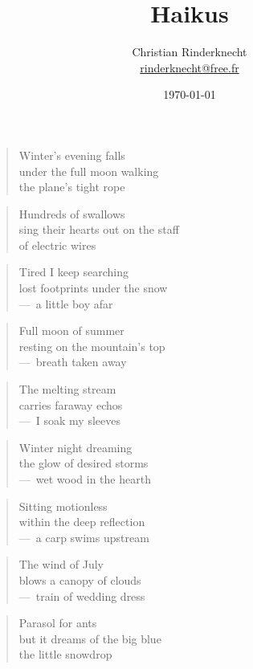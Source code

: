 \documentclass[a4paper,12pt]{article}
\title{Haikus}
\author{Christian Rinderknecht\\
{\small \url{rinderknecht@free.fr}}}
\date{\today}
\begin{document}
\begin{verse}
  Winter's evening falls \\
  under the full moon walking \\
  the plane's tight rope
\end{verse}

\begin{verse}
  Hundreds of swallows \\
  sing their hearts out on the staff \\
  of electric wires
\end{verse}

\begin{verse}
  Tired I keep searching \\
  lost footprints under the snow \\
  ---~a little boy afar
\end{verse}

\begin{verse}
  Full moon of summer \\
  resting on the mountain's top \\
  ---~breath taken away
\end{verse}

\begin{verse}
  The melting stream \\
  carries faraway echos \\
  ---~I soak my sleeves
\end{verse}

\begin{verse}
  Winter night dreaming \\
  the glow of desired storms \\
  ---~wet wood in the hearth
\end{verse}

\begin{verse}
  Sitting motionless \\
  within the deep reflection \\
  ---~a carp swims upstream
\end{verse}

\begin{verse}
  The wind of July \\
  blows a canopy of clouds \\
  ---~train of wedding dress
\end{verse}

\begin{verse}
  Parasol for ants \\
  but it dreams of the big blue \\
  the little snowdrop
\end{verse}
\end{document}
